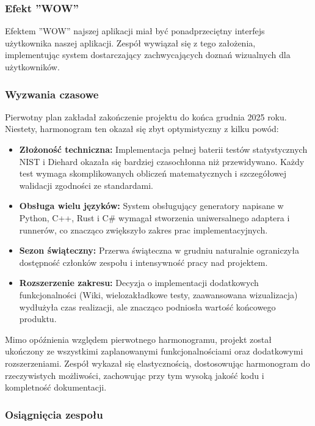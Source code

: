 \documentclass[12pt,a4paper]{article}
\begin{document}
\subsubsection{Efekt ''WOW''}
Efektem ''WOW'' najszej aplikacji miał być ponadprzeciętny interfejs użytkownika naszej aplikacji. Zespół wywiązał się z tego założenia, implementując system dostarczający zachwycających doznań wizualnych dla użytkowników.

\subsubsection{Wyzwania czasowe}

Pierwotny plan zakładał zakończenie projektu do końca grudnia 2025 roku. Niestety, harmonogram ten okazał się zbyt optymistyczny z kilku powód:

\begin{itemize}
    \item \textbf{Złożoność techniczna:} Implementacja pełnej baterii testów statystycznych NIST i Diehard okazała się bardziej czasochłonna niż przewidywano. Każdy test wymaga skomplikowanych obliczeń matematycznych i szczegółowej walidacji zgodności ze standardami.
    
    \item \textbf{Obsługa wielu języków:} System obsługujący generatory napisane w Python, C++, Rust i C\# wymagał stworzenia uniwersalnego adaptera i runnerów, co znacząco zwiększyło zakres prac implementacyjnych.
    
    \item \textbf{Sezon świąteczny:} Przerwa świąteczna w grudniu naturalnie ograniczyła dostępność członków zespołu i intensywność pracy nad projektem.
    
    \item \textbf{Rozszerzenie zakresu:} Decyzja o implementacji dodatkowych funkcjonalności (Wiki, wielozakładkowe testy, zaawansowana wizualizacja) wydłużyła czas realizacji, ale znacząco podniosła wartość końcowego produktu.
\end{itemize}

Mimo opóźnienia względem pierwotnego harmonogramu, projekt został ukończony ze wszystkimi zaplanowanymi funkcjonalnościami oraz dodatkowymi rozszerzeniami. Zespół wykazał się elastycznością, dostosowując harmonogram do rzeczywistych możliwości, zachowując przy tym wysoką jakość kodu i kompletność dokumentacji.

\subsubsection{Osiągnięcia zespołu}
\end{document}
